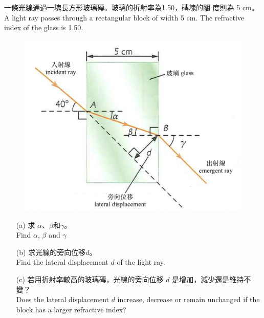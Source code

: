 \documentclass[beamer=true]{standalone}
\begin{document}
\begin{eg}
一條光線通過一塊長方形玻璃磚。玻璃的折射率為1.50，磚塊的闊 度則為 5 cm。\\A light ray passes through a rectangular block of width 5 cm. The refractive index of the glass is 1.50.
    \begin{figure}
        \centering
        \includegraphics[width=0.6\linewidth]{assets/ud928u82n.png}
    \end{figure}
\end{eg}

\begin{eg}
    \begin{itemize}
        \item [(a)] 求 $\alpha$、$\beta$和$\gamma$。\\Find $\alpha$, $\beta$ and $\gamma$
    \end{itemize}
\end{eg}

\begin{eg}
    \begin{itemize}
        \item [(b)] 求光線的旁向位移$d$。\\Find the lateral displacement $d$ of the light ray.
    \end{itemize}
\end{eg}

\begin{eg}
    \begin{itemize}
        \item [(c)] 若用折射率較高的玻璃磚，光線的旁向位移 $d$ 是增加，減少還是維持不變？\\Does the lateral displacement $d$ increase, decrease or remain unchanged if the block has a larger refractive index?
    \end{itemize}
\end{eg}
\end{document}
